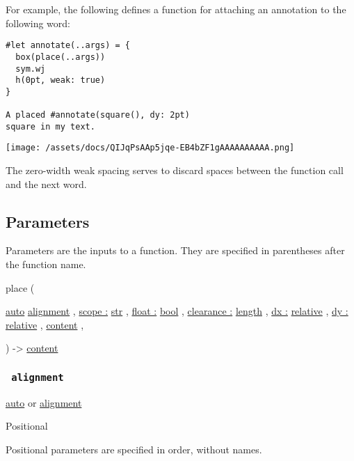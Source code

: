For example, the following defines a function for attaching an
annotation to the following word:

\begin{verbatim}
#let annotate(..args) = {
  box(place(..args))
  sym.wj
  h(0pt, weak: true)
}

A placed #annotate(square(), dy: 2pt)
square in my text.
\end{verbatim}

\texttt{[image: /assets/docs/QIJqPsAAp5jqe-EB4bZF1gAAAAAAAAAA.png]}

The zero-width weak spacing serves to discard spaces between the
function call and the next word.

\subsection{\texorpdfstring{{ Parameters
}}{ Parameters }}\label{parameters}

\label{parameters-tooltip}
Parameters are the inputs to a function. They are specified in
parentheses after the function name.

{ place } (

{ \hyperref[parameters-alignment]{}
\href{/docs/reference/foundations/auto/}{auto}
\href{/docs/reference/layout/alignment/}{alignment} , } {
\hyperref[parameters-scope]{scope :}
\href{/docs/reference/foundations/str/}{str} , } {
\hyperref[parameters-float]{float :}
\href{/docs/reference/foundations/bool/}{bool} , } {
\hyperref[parameters-clearance]{clearance :}
\href{/docs/reference/layout/length/}{length} , } {
\hyperref[parameters-dx]{dx :}
\href{/docs/reference/layout/relative/}{relative} , } {
\hyperref[parameters-dy]{dy :}
\href{/docs/reference/layout/relative/}{relative} , } {
\href{/docs/reference/foundations/content/}{content} , }

) -\textgreater{} \href{/docs/reference/foundations/content/}{content}

\subsubsection{\texorpdfstring{\texttt{\ alignment\ }}{ alignment }}\label{parameters-alignment}

\href{/docs/reference/foundations/auto/}{auto} {or}
\href{/docs/reference/layout/alignment/}{alignment}

{{ Positional }}

\label{parameters-alignment-positional-tooltip}
Positional parameters are specified in order, without names.

